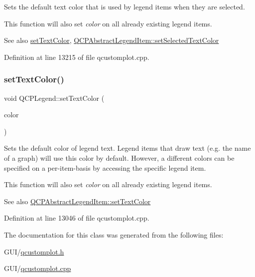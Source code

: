 Sets the default text color that is used by legend items when they are selected.

This function will also set {\itshape color} on all already existing legend items.

\begin{DoxySeeAlso}{See also}
\hyperlink{class_q_c_p_legend_ae1eb239ff4a4632fe1b6c3e668d845c6}{set\+Text\+Color}, \hyperlink{class_q_c_p_abstract_legend_item_a4d01d008ee1a5bfe9905b0397a421936}{Q\+C\+P\+Abstract\+Legend\+Item\+::set\+Selected\+Text\+Color} 
\end{DoxySeeAlso}


Definition at line 13215 of file qcustomplot.\+cpp.

\mbox{\label{class_q_c_p_legend_ae1eb239ff4a4632fe1b6c3e668d845c6}} 
\subsubsection{\texorpdfstring{set\+Text\+Color()}{setTextColor()}}
{\footnotesize\ttfamily void Q\+C\+P\+Legend\+::set\+Text\+Color (\begin{DoxyParamCaption}\item[{const Q\+Color \&}]{color }\end{DoxyParamCaption})}

Sets the default color of legend text. Legend items that draw text (e.\+g. the name of a graph) will use this color by default. However, a different colors can be specified on a per-\/item-\/basis by accessing the specific legend item.

This function will also set {\itshape color} on all already existing legend items.

\begin{DoxySeeAlso}{See also}
\hyperlink{class_q_c_p_abstract_legend_item_a6ebace6aaffaedcdab2d74e88acc2d1e}{Q\+C\+P\+Abstract\+Legend\+Item\+::set\+Text\+Color} 
\end{DoxySeeAlso}


Definition at line 13046 of file qcustomplot.\+cpp.



The documentation for this class was generated from the following files\+:\begin{DoxyCompactItemize}
\item 
G\+U\+I/\hyperlink{qcustomplot_8h}{qcustomplot.\+h}\item 
G\+U\+I/\hyperlink{qcustomplot_8cpp}{qcustomplot.\+cpp}\end{DoxyCompactItemize}
